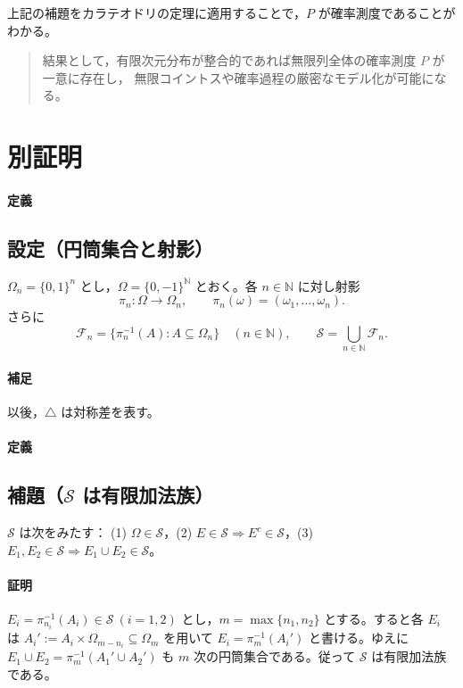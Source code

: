 \documentclass[uplatex,dvipdfmx,11pt,a4paper,openany]{bxjsbook}
\begin{document}
上記の補題をカラテオドリの定理に適用することで，\(P\) が確率測度であることがわかる。


\begin{quote}
結果として，有限次元分布が整合的であれば無限列全体の確率測度 \(P\) が一意に存在し，
                    無限コイントスや確率過程の厳密なモデル化が可能になる。

\end{quote}

\section{別証明}
\paragraph{定義}
\subsection{設定（円筒集合と射影）}
\(\Omega_n = \{0,1\}^n\) とし，\(\Omega = \{0,-1\}^{\mathbb{N}}\) とおく。各 \(n\in\mathbb{N}\) に対し射影
                    \[\pi_n: \Omega \to \Omega_n,\qquad \pi_n(\omega) = (\omega_1,\dots,\omega_n).\]
                    さらに
                    \[\mathcal{F}_n = \bigl\{\pi_n^{-1}(A): A\subseteq \Omega_n\bigr\}\quad (n\in\mathbb{N}),\qquad \mathcal{S} = \bigcup_{n\in\mathbb{N}} \mathcal{F}_n.\]

\paragraph{補足}
以後，\(\triangle\) は対称差を表す。



\paragraph{定義}
\subsection{補題（\(\mathcal{S}\) は有限加法族）}
\(\mathcal{S}\) は次をみたす： (1) \(\Omega\in\mathcal{S}\)，(2) \(E\in\mathcal{S}\Rightarrow E^c\in\mathcal{S}\)，(3) \(E_1,E_2\in\mathcal{S}\Rightarrow E_1\cup E_2\in\mathcal{S}\)。

\paragraph{証明}
\(E_i=\pi_{n_i}^{-1}(A_i)\in\mathcal{S}\ (i=1,2)\) とし，\(m=\max\{n_1,n_2\}\) とする。すると各 \(E_i\) は
                        \(A_i' := A_i\times \Omega_{m-n_i}\subseteq \Omega_m\) を用いて \(E_i = \pi_m^{-1}(A_i')\) と書ける。ゆえに
                        \(E_1\cup E_2 = \pi_m^{-1}(A_1'\cup A_2')\) も \(m\) 次の円筒集合である。従って \(\mathcal{S}\) は有限加法族である。
\end{document}
